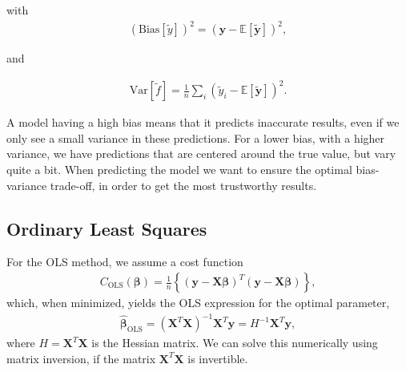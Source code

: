 \documentclass[reprint,english,notitlepage]{revtex4-1}  %
\begin{document}
with 
\begin{align}
    (\text{Bias}[\tilde{y}])^2 = (\boldsymbol{y} - \mathbb{E}[\boldsymbol{\tilde{y}}])^2, 
\end{align}

and 

\begin{align}
    \text{Var}[\tilde{f}] = \frac{1}{n}\sum\limits_i (\tilde{y}_i - \mathbb{E}[\boldsymbol{\tilde{y}}])^2. 
\end{align}

A model having a high bias means that it predicts inaccurate results, even if we only see a small variance in these predictions. 
For a lower bias, with a higher variance, we have predictions that are centered around the true value, but vary quite a bit. 
When predicting the model we want to ensure the optimal bias-variance trade-off, in order to get the most trustworthy results. 

















\subsection*{Ordinary Least Squares}
For the OLS method, we assume a cost function 
\begin{align}\label{eq: costfunc_OLS}
    C_\text{OLS}(\boldsymbol{\beta}) = \frac{1}{n}\left\{(\boldsymbol{y} - \mathbf{X}\boldsymbol{\beta})^T (\boldsymbol{y} - \mathbf{X}\boldsymbol{\beta})\right\},
\end{align}
which, when minimized, yields the OLS expression for the optimal parameter, 
\begin{align}\label{eq: optimal_OLS}
    \boldsymbol{\hat{\beta}}_\text{OLS} 
    = (\mathbf{X}^T \mathbf{X})^{-1} \mathbf{X}^T\boldsymbol{y} 
    = H^{-1} \mathbf{X}^T\boldsymbol{y} , 
\end{align}
where $H = \mathbf{X}^T \mathbf{X}$ is the Hessian matrix. We can solve this numerically using matrix inversion, if the matrix $\mathbf{X}^T \mathbf{X}$ is invertible. 
\end{document}
